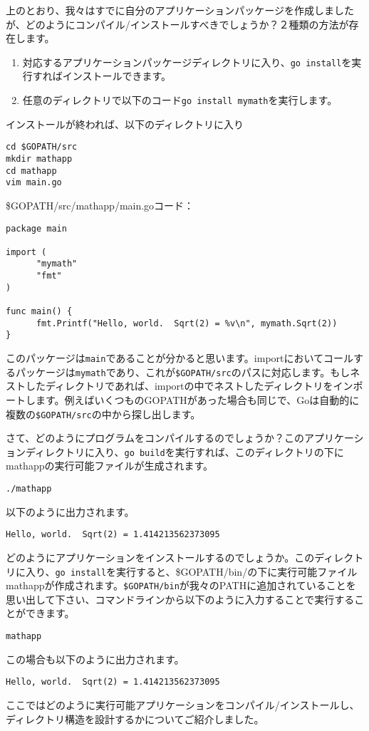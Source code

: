 上のとおり、我々はすでに自分のアプリケーションパッケージを作成しましたが、どのようにコンパイル/インストールすべきでしょうか？２種類の方法が存在します。

\begin{enumerate}
  \item 対応するアプリケーションパッケージディレクトリに入り、\texttt{go install}を実行すればインストールできます。
  \item 任意のディレクトリで以下のコード\texttt{go install mymath}を実行します。
\end{enumerate}

インストールが終われば、以下のディレクトリに入り

\begin{lstlisting}[numbers=none]
cd $GOPATH/src
mkdir mathapp
cd mathapp
vim main.go
\end{lstlisting}

\$GOPATH\//src\//mathapp\//main.goコード：

\begin{lstlisting}[numbers=none]
package main

import (
      "mymath"
      "fmt"
)

func main() {
      fmt.Printf("Hello, world.  Sqrt(2) = %v\n", mymath.Sqrt(2))
}
\end{lstlisting}

このパッケージは\texttt{main}であることが分かると思います。importにおいてコールするパッケージは\texttt{mymath}であり、これが\texttt{\$GOPATH\//src}のパスに対応します。もしネストしたディレクトリであれば、importの中でネストしたディレクトリをインポートします。例えばいくつものGOPATHがあった場合も同じで、Goは自動的に複数の\texttt{\$GOPATH\//src}の中から探し出します。

さて、どのようにプログラムをコンパイルするのでしょうか？このアプリケーションディレクトリに入り、\texttt{go build}を実行すれば、このディレクトリの下にmathappの実行可能ファイルが生成されます。

\begin{lstlisting}[numbers=none]
./mathapp
\end{lstlisting}

以下のように出力されます。

\begin{lstlisting}[numbers=none]
Hello, world.  Sqrt(2) = 1.414213562373095
\end{lstlisting}

どのようにアプリケーションをインストールするのでしょうか。このディレクトリに入り、\texttt{go install}を実行すると、\$GOPATH\//bin\//の下に実行可能ファイルmathappが作成されます。\texttt{\$GOPATH\//bin}が我々のPATHに追加されていることを思い出して下さい、コマンドラインから以下のように入力することで実行することができます。

\begin{lstlisting}[numbers=none]
mathapp
\end{lstlisting}

この場合も以下のように出力されます。

\begin{lstlisting}[numbers=none]
Hello, world.  Sqrt(2) = 1.414213562373095
\end{lstlisting}

ここではどのように実行可能アプリケーションをコンパイル/インストールし、ディレクトリ構造を設計するかについてご紹介しました。




